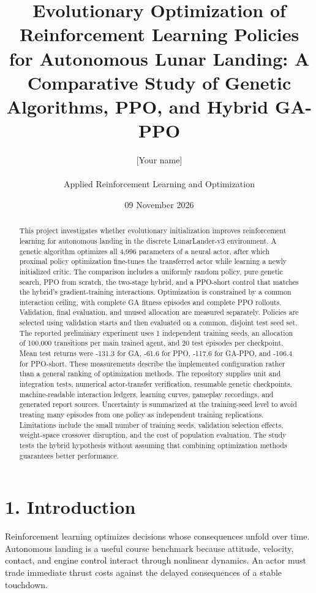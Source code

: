\documentclass[11pt,a4paper]{article}
\title{Evolutionary Optimization of Reinforcement Learning Policies for Autonomous Lunar Landing: A Comparative Study of Genetic Algorithms, PPO, and Hybrid GA-PPO}
\author{[Your name] \\ [Your institution] \\ Applied Reinforcement Learning and Optimization}
\date{09 November 2026}
\begin{document}
\maketitle
\begin{abstract}
This project investigates whether evolutionary initialization improves reinforcement learning for autonomous landing in the discrete LunarLander-v3 environment. A genetic algorithm optimizes all 4,996 parameters of a neural actor, after which proximal policy optimization fine-tunes the transferred actor while learning a newly initialized critic. The comparison includes a uniformly random policy, pure genetic search, PPO from scratch, the two-stage hybrid, and a PPO-short control that matches the hybrid's gradient-training interactions. Optimization is constrained by a common interaction ceiling, with complete GA fitness episodes and complete PPO rollouts. Validation, final evaluation, and unused allocation are measured separately. Policies are selected using validation starts and then evaluated on a common, disjoint test seed set. The reported preliminary experiment uses 1 independent training seeds, an allocation of 100,000 transitions per main trained agent, and 20 test episodes per checkpoint. Mean test returns were -131.3 for GA, -61.6 for PPO, -117.6 for GA-PPO, and -106.4 for PPO-short. These measurements describe the implemented configuration rather than a general ranking of optimization methods. The repository supplies unit and integration tests, numerical actor-transfer verification, resumable genetic checkpoints, machine-readable interaction ledgers, learning curves, gameplay recordings, and generated report sources. Uncertainty is summarized at the training-seed level to avoid treating many episodes from one policy as independent training replications. Limitations include the small number of training seeds, validation selection effects, weight-space crossover disruption, and the cost of population evaluation. The study tests the hybrid hypothesis without assuming that combining optimization methods guarantees better performance.
\end{abstract}
\newpage
\tableofcontents
\newpage
\section*{1. Introduction}
Reinforcement learning optimizes decisions whose consequences unfold over time. Autonomous landing is a useful course benchmark because attitude, velocity, contact, and engine control interact through nonlinear dynamics. An actor must trade immediate thrust costs against the delayed consequences of a stable touchdown.
\end{document}
